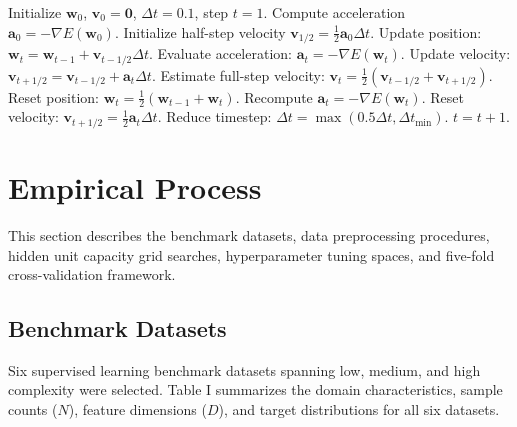 \documentclass[10pt, conference]{IEEEtran}
\begin{document}
\begin{algorithm}[t]
\caption{LeapFrog Dynamic Optimization (Snyman 1982)}
\begin{algorithmic}[1]
\STATE Initialize $\mathbf{w}_0$, $\mathbf{v}_0 = \mathbf{0}$, $\Delta t = 0.1$, step $t = 1$.
\STATE Compute acceleration $\mathbf{a}_0 = -\nabla E(\mathbf{w}_0)$.
\STATE Initialize half-step velocity $\mathbf{v}_{1/2} = \frac{1}{2} \mathbf{a}_0 \Delta t$.
    \STATE Update position: $\mathbf{w}_{t} = \mathbf{w}_{t-1} + \mathbf{v}_{t-1/2} \Delta t$.
    \STATE Evaluate acceleration: $\mathbf{a}_{t} = -\nabla E(\mathbf{w}_{t})$.
    \STATE Update velocity: $\mathbf{v}_{t+1/2} = \mathbf{v}_{t-1/2} + \mathbf{a}_{t} \Delta t$.
    \STATE Estimate full-step velocity: $\mathbf{v}_t = \frac{1}{2}(\mathbf{v}_{t-1/2} + \mathbf{v}_{t+1/2})$.
        \STATE Reset position: $\mathbf{w}_t = \frac{1}{2}(\mathbf{w}_{t-1} + \mathbf{w}_t)$.
        \STATE Recompute $\mathbf{a}_t = -\nabla E(\mathbf{w}_t)$.
        \STATE Reset velocity: $\mathbf{v}_{t+1/2} = \frac{1}{2} \mathbf{a}_t \Delta t$.
        \STATE Reduce timestep: $\Delta t = \max(0.5 \Delta t, \Delta t_{\min})$.
    \ENDIF
    \STATE $t = t + 1$.
\ENDWHILE
\end{algorithmic}
\end{algorithm}

\section{Empirical Process}

This section describes the benchmark datasets, data preprocessing procedures, hidden unit capacity grid searches, hyperparameter tuning spaces, and five-fold cross-validation framework.

\subsection{Benchmark Datasets}

Six supervised learning benchmark datasets spanning low, medium, and high complexity were selected. Table I summarizes the domain characteristics, sample counts ($N$), feature dimensions ($D$), and target distributions for all six datasets.
\end{document}
